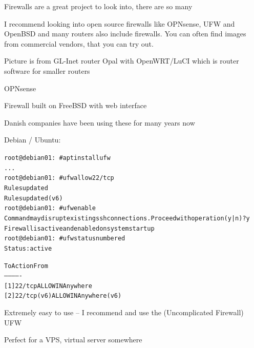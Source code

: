 \documentclass[Screen16to9,17pt]{foils}
\begin{document}


\begin{list2}
\item Firewalls are a great project to look into, there are so many \smiley
\item I recommend looking into open source firewalls like OPNsense, UFW and OpenBSD and many routers also include firewalls. You can often find images from commercial vendors, that you can try out.
\item Picture is from GL-Inet router Opal with OpenWRT/LuCI which is router software for smaller routers
\end{list2}




\begin{list2}
\item OPNsense 
\item Firewall built on FreeBSD with web interface
\item Danish companies have been using these for many years now
\end{list2}



Debian / Ubuntu:
\begin{alltt}\scriptsize
root@debian01:~# apt install ufw
...
root@debian01:~# ufw allow 22/tcp
Rules updated
Rules updated (v6)
root@debian01:~# ufw enable
Command may disrupt existing ssh connections. Proceed with operation (y|n)? y
Firewall is active and enabled on system startup
root@debian01:~# ufw status numbered
Status: active

     To                         Action      From
     --                         ------      ----
[ 1] 22/tcp                     ALLOW IN    Anywhere
[ 2] 22/tcp (v6)                ALLOW IN    Anywhere (v6)
\end{alltt}

\begin{list2}
\item Extremely easy to use -- I recommend and use the (Uncomplicated Firewall) UFW
\item Perfect for a VPS, virtual server somewhere
\end{list2}

\end{document}
